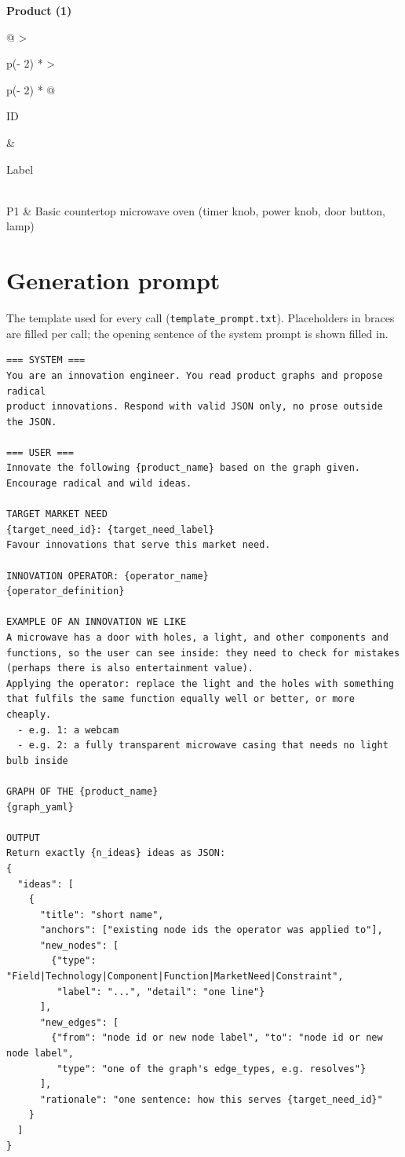 \textbf{Product (1)}

\begin{longtable}[]{@{}
  >{\raggedright\arraybackslash}p{(\columnwidth - 2\tabcolsep) * }
  >{\raggedright\arraybackslash}p{(\columnwidth - 2\tabcolsep) * }@{}}
\toprule\noalign{}
\begin{minipage}[b]{\linewidth}\raggedright
ID
\end{minipage} & \begin{minipage}[b]{\linewidth}\raggedright
Label
\end{minipage} \\
\midrule\noalign{}
\endhead
\bottomrule\noalign{}
\endlastfoot
P1 & Basic countertop microwave oven (timer knob, power knob, door button, lamp) \\
\end{longtable}

\hypertarget{generation-prompt}{%
\section{Generation prompt}\label{generation-prompt}}

The template used for every call (\texttt{template\_prompt.txt}). Placeholders in braces are filled per call; the opening sentence of the system prompt is shown filled in.

\begin{verbatim}
=== SYSTEM ===
You are an innovation engineer. You read product graphs and propose radical
product innovations. Respond with valid JSON only, no prose outside the JSON.

=== USER ===
Innovate the following {product_name} based on the graph given.
Encourage radical and wild ideas.

TARGET MARKET NEED
{target_need_id}: {target_need_label}
Favour innovations that serve this market need.

INNOVATION OPERATOR: {operator_name}
{operator_definition}

EXAMPLE OF AN INNOVATION WE LIKE
A microwave has a door with holes, a light, and other components and
functions, so the user can see inside: they need to check for mistakes
(perhaps there is also entertainment value).
Applying the operator: replace the light and the holes with something
that fulfils the same function equally well or better, or more cheaply.
  - e.g. 1: a webcam
  - e.g. 2: a fully transparent microwave casing that needs no light bulb inside

GRAPH OF THE {product_name}
{graph_yaml}

OUTPUT
Return exactly {n_ideas} ideas as JSON:
{
  "ideas": [
    {
      "title": "short name",
      "anchors": ["existing node ids the operator was applied to"],
      "new_nodes": [
        {"type": "Field|Technology|Component|Function|MarketNeed|Constraint",
         "label": "...", "detail": "one line"}
      ],
      "new_edges": [
        {"from": "node id or new node label", "to": "node id or new node label",
         "type": "one of the graph's edge_types, e.g. resolves"}
      ],
      "rationale": "one sentence: how this serves {target_need_id}"
    }
  ]
}
\end{verbatim}

